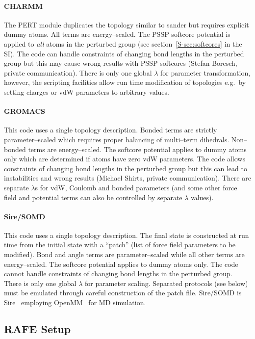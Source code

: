\documentclass[journal=jctcce,manuscript=article]{achemso}
\begin{document}
\paragraph{CHARMM} The PERT module duplicates the topology similar to
sander but requires explicit dummy atoms.  All terms are
energy--scaled.  The PSSP softcore potential is applied to \emph{all}
atoms in the perturbed group (see section~\ref{S-sec:softcores} in the SI).  The code can handle
constraints of changing bond lengths in the perturbed group but this
may cause wrong results with PSSP softcores (Stefan Boresch, private
communication).  There is only one global $\lambda$ for parameter
transformation, however, the scripting facilities allow run time
modification of topologies e.g.\ by setting charges or vdW parameters
to arbitrary values.

\paragraph{GROMACS} This code uses a single topology description.
Bonded terms are strictly parameter--scaled which requires proper
balancing of multi--term dihedrals.  Non--bonded terms are
energy--scaled.  The softcore potential applies to dummy atoms only
which are determined if atoms have zero vdW parameters.  The code
allows constraints of changing bond lengths in the perturbed group but
this can lead to instabilities and wrong results (Michael Shirts,
private communication).  There are separate $\lambda$s for vdW,
Coulomb and bonded parameters (and some other force field and potential 
terms can also be controlled by separate $\lambda$ values).

\paragraph{Sire/SOMD} This code uses a single topology description.
The final state is constructed at run time from the initial state with
a ``patch'' (list of force field parameters to be modified).  Bond and
angle terms are parameter--scaled while all other terms are
energy--scaled.  The softcore potential applies to dummy atoms only.
The code cannot handle constraints of changing bond lengths in the
perturbed group.  There is only one global $\lambda$ for parameter
scaling.  Separated protocols (see below) must be emulated through
careful construction of the patch file.  Sire/SOMD is
Sire~\cite{Sire-2016} employing OpenMM~\cite{doi:10.1021/ct300857j}
for MD simulation.

\subsection{RAFE Setup}
\label{sec:rafe_setup}
\end{document}

